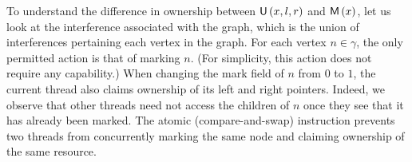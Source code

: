 To understand the difference in ownership between $\textsf{U}\left(x, l, r\right)$ and $\textsf{M}\left(x\right)$, let us look at the interference associated
with the graph, which is the union of interferences pertaining each
vertex in the graph. For each vertex $n \in \gamma$, the only
permitted action is that of marking $n$. (For simplicity, this action
does not require any capability.)  When changing the mark field of $n$
from $0$ to $1$, the current thread also claims ownership of its left
and right pointers. Indeed, we observe that other threads need not
access the children of $n$ once they see that it has already been
marked. The atomic  (compare-and-swap) instruction prevents
two threads from concurrently marking the same node and claiming ownership
of the same resource.

